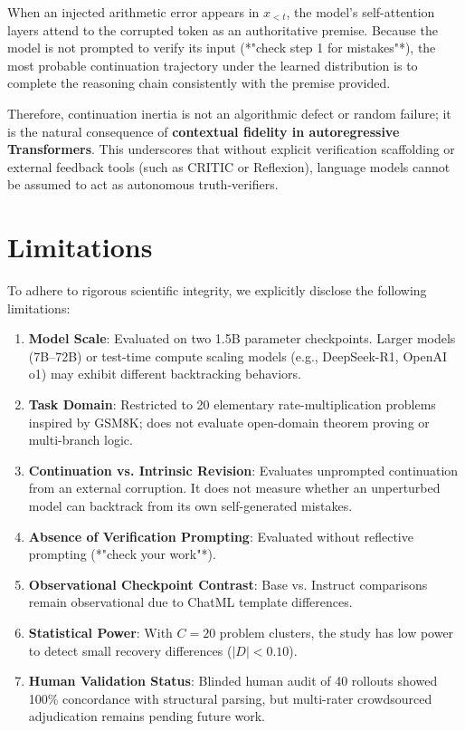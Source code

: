 \documentclass[11pt,letterpaper]{article}
\begin{document}
When an injected arithmetic error appears in $x_{<t}$, the model's self-attention layers attend to the corrupted token as an authoritative premise. Because the model is not prompted to verify its input (*"check step 1 for mistakes"*), the most probable continuation trajectory under the learned distribution is to complete the reasoning chain consistently with the premise provided. 

Therefore, continuation inertia is not an algorithmic defect or random failure; it is the natural consequence of \textbf{contextual fidelity in autoregressive Transformers}. This underscores that without explicit verification scaffolding or external feedback tools (such as CRITIC or Reflexion), language models cannot be assumed to act as autonomous truth-verifiers.

\section{Limitations}

To adhere to rigorous scientific integrity, we explicitly disclose the following limitations:
\begin{enumerate}[leftmargin=*]
    \item \textbf{Model Scale}: Evaluated on two 1.5B parameter checkpoints. Larger models (7B--72B) or test-time compute scaling models (e.g., DeepSeek-R1, OpenAI o1) may exhibit different backtracking behaviors.
    \item \textbf{Task Domain}: Restricted to 20 elementary rate-multiplication problems inspired by GSM8K; does not evaluate open-domain theorem proving or multi-branch logic.
    \item \textbf{Continuation vs. Intrinsic Revision}: Evaluates unprompted continuation from an external corruption. It does not measure whether an unperturbed model can backtrack from its own self-generated mistakes.
    \item \textbf{Absence of Verification Prompting}: Evaluated without reflective prompting (*"check your work"*).
    \item \textbf{Observational Checkpoint Contrast}: Base vs. Instruct comparisons remain observational due to ChatML template differences.
    \item \textbf{Statistical Power}: With $C=20$ problem clusters, the study has low power to detect small recovery differences ($|D| < 0.10$).
    \item \textbf{Human Validation Status}: Blinded human audit of 40 rollouts showed 100\% concordance with structural parsing, but multi-rater crowdsourced adjudication remains pending future work.
\end{enumerate}
\end{document}
